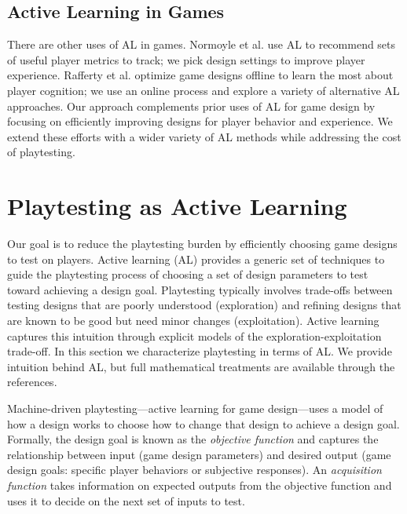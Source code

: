 \documentclass{sig-alternate}
\begin{document}
\subsection{Active Learning in Games}

There are other uses of AL in games.
Normoyle et al. \cite{normoyle2012:al-metrics} use AL to recommend sets of useful player metrics to track; we pick design settings to improve player experience.
Rafferty et al. \cite{rafferty2012:opt-cog-game} optimize game designs offline to learn the most about player cognition; we use an online process and explore a variety of alternative AL approaches.
Our approach complements prior uses of AL for game design by focusing on efficiently improving designs for player behavior and experience.
We extend these efforts with a wider variety of AL methods while addressing the cost of playtesting.



\section{Playtesting as Active Learning}

Our goal is to reduce the playtesting burden by efficiently choosing game designs to test on players.
Active learning (AL) provides a generic set of techniques to guide the playtesting process of choosing a set of design parameters to test toward achieving a design goal.
Playtesting typically involves trade-offs between testing designs that are poorly understood (exploration) and refining designs that are known to be good but need minor changes (exploitation).
Active learning captures this intuition through explicit models of the exploration-exploitation trade-off.
In this section we characterize playtesting in terms of AL.
We provide intuition behind AL, but full mathematical treatments are available through the references.


Machine-driven playtesting---active learning for game design---uses a model of how a design works to choose how to change that design to achieve a design goal.
Formally, the design goal is known as the \textit{objective function} and captures the relationship between input (game design parameters) and desired output (game design goals: specific player behaviors or subjective responses).
An \textit{acquisition function} takes information on expected outputs from the objective function and uses it to decide on the next set of inputs to test.
\end{document}
